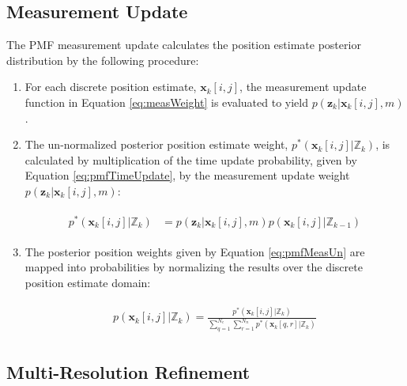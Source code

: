 \subsection{Measurement Update}
\label{framework.PMF.Measurement}

The PMF measurement update calculates the position estimate posterior distribution by the following procedure:

 \begin{enumerate}
 
 \item For each discrete position estimate, $\mathbf{x}_k[i,j]$, the measurement update function in Equation \ref{eq:measWeight} is evaluated to yield $p(\mathbf{z}_k | \mathbf{x}_k[i,j], m)$. 
 
 \item The un-normalized posterior position estimate weight, $p^{*}(\mathbf{x}_k[i,j] | \mathbb{Z}_k)$, is calculated by multiplication of the time update probability, given by Equation \ref{eq:pmfTimeUpdate}, by the measurement update weight $p(\mathbf{z}_k | \mathbf{x}_k[i,j], m)$:
 
 \begin{align}
 \begin{split}
 p^{*}(\mathbf{x}_k[i,j] | \mathbb{Z}_k) &= p(\mathbf{z}_k | \mathbf{x}_k[i,j], m) p(\mathbf{x}_k[i,j] | \mathbb{Z}_{k-1}) 
 \end{split}
 \label{eq:pmfMeasUn}
 \end{align}
 
 \item The posterior position weights given by Equation \ref{eq:pmfMeasUn} are mapped into probabilities by normalizing the results over the discrete position estimate domain:
 
 \begin{align}
 \begin{split}
 p(\mathbf{x}_k[i,j] | \mathbb{Z}_k) = \frac{p^{*}(\mathbf{x}_k[i,j] | \mathbb{Z}_k)}{\sum_{q=1}^{N_e} \sum_{r=1}^{N_n} p^{*}(\mathbf{x}_k[q,r] | \mathbb{Z}_k)}
 \end{split}
 \label{eq:pmfMeasNormalize}
 \end{align}
 
 \end{enumerate}

\subsection{Multi-Resolution Refinement}
\label{framework.PMF.Multi}

